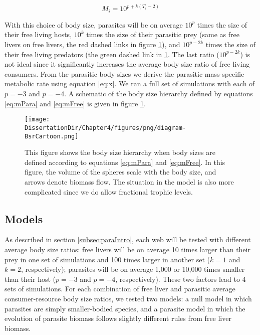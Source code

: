 \documentclass[/home/nkappler/Research/Dissertation/dissertation.tex]{subfiles}
\begin{document}
\begin{bibunit}
\begin{equation}
M_i = 10^{p + k(T_i - 2)} \label{eq:mPara}
\end{equation}

With this choice of body size, parasites will be on average $10^{p}$ times the
size of their free living hosts, $10^k$ times the size of their parasitic prey
(same as free livers on free livers, the red dashed links in figure
\ref{fig:bsrCartoon}), and $10^{p-2k}$ times the size of their free living
predators (the green dashed link in \ref{fig:bsrCartoon}. The last ratio
($10^{p-2k}$) is not ideal since it significantly increases the average body
size ratio of free living consumers. From the parasitic body sizes we derive
the parasitic mass-specific metabolic rate using equation \eqref{eq:x}. We ran
a full set of simulations with each of $p=-3$ and $p=-4$. A schematic of the
body size hierarchy defined by equations \eqref{eq:mPara} and \eqref{eq:mFree}
is given in figure \ref{fig:bsrCartoon}.

\begin{figure}
    \texttt{[image: \\DissertationDir/Chapter4/figures/png/diagram-BsrCartoon.png]}
    \caption[Cartoon of body size ratios]{This figure shows the body size
    hierarchy when body sizes are defined according to equations
\eqref{eq:mPara} and \eqref{eq:mFree}. In this figure, the volume of the
spheres scale with the body size, and arrows denote biomass flow. The situation
in the model is also more complicated since we do allow fractional trophic
levels.\label{fig:bsrCartoon}} \end{figure}

\subsection{Models\label{subsec:models}}

As described in section \ref{subsec:paraIntro}, each web will be tested with
different average body size ratios: free livers will be on average 10 times
larger than their prey in one set of simulations and 100 times larger in
another set ($k=1$ and $k=2$, respectively); parasites will be on average 1,000
or 10,000 times smaller than their host ($p=-3$ and $p=-4$, respectively).
These two factors lead to 4 sets of simulations. For each combination of free
liver and parasitic average consumer-resource body size ratios, we tested two
models: a null model in which parasites are simply smaller-bodied species, and
a parasite model in which the evolution of parasite biomass follows slightly
different rules from free liver biomass.


\end{bibunit}
\end{document}
